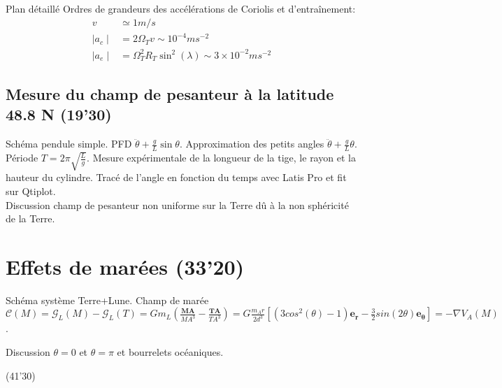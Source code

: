 \begin{reportBlock}{Plan détaillé}
Ordres de grandeurs des accélérations de Coriolis et d'entraînement:
\begin{align}
v & \simeq  1m/s \\
\mid a_c \mid & = 2 \Omega_T v \sim 10^{-4} m s^{-2}   \\
\mid a_e \mid & = \Omega_T^2 R_T \sin^2(\lambda) \sim 3\times10^{-2} m s^{-2}
\end{align}

\subsection{Mesure du champ de pesanteur à la latitude 48.8 N (19'30)}

Schéma pendule simple. PFD $\ddot{\theta} + \frac{g}{L} \sin \theta$. Approximation des petits angles $\ddot{\theta} + \frac{g}{L} \theta$. Période $T = 2\pi\sqrt{\frac{L}{g}}$. Mesure expérimentale de la longueur de la tige, le rayon et la hauteur du cylindre. Tracé de l'angle en fonction du temps avec Latis Pro et fit sur Qtiplot.\\

Discussion champ de pesanteur non uniforme sur la Terre dû à la non sphéricité de la Terre.

\section{Effets de marées (33'20)}

Schéma système Terre+Lune. Champ de marée $\mathbf{\mathcal{C}}(M) = \mathbf{\mathcal{G}}_L(M) - \mathbf{\mathcal{G}}_L(T) =  G m_L \left( \frac{\mathbf{MA}}{MA^3} - \frac{\mathbf{TA}}{TA^3} \right) = G \frac{m_A r}{2d^3} \left[(3cos^2(\theta) - 1) \mathbf{e_r} - \frac{3}{2} sin(2\theta) \mathbf{e_\theta} \right] = - \nabla V_A(M)$.


Discussion $\theta = 0$ et $\theta = \pi$ et bourrelets océaniques.

(41'30)

\end{reportBlock}


